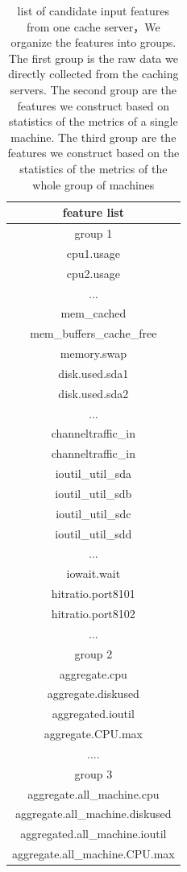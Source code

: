 \documentclass[5p]{elsarticle}
\begin{document}
\begin{table}[]
\centering
\begin{tabular}{|c|}
\hline  
feature list\\
\hline  
group 1\\
\hline  
cpu1.usage\\
cpu2.usage\\
...  \\
mem\_cached\\
mem\_buffers\_cache\_free\\
memory.swap\\ 
disk.used.sda1\\
disk.used.sda2\\
...\\
channeltraffic\_in\\
channeltraffic\_in\\
ioutil\_util\_sda\\
ioutil\_util\_sdb\\
ioutil\_util\_sdc\\
ioutil\_util\_sdd\\
...\\
iowait.wait\\
hitratio.port8101\\
hitratio.port8102\\
...\\
\hline  
group 2\\
\hline 
aggregate.cpu\\
aggregate.diskused\\
aggregated.ioutil\\
aggregate.CPU.max\\
....\\
\hline  
group 3\\
\hline 
aggregate.all\_machine.cpu\\
aggregate.all\_machine.diskused\\
aggregated.all\_machine.ioutil\\
aggregate.all\_machine.CPU.max\\
\hline
\end{tabular}
\caption{list of candidate input features from one cache server，We organize the features into groups. The first group is the raw data we directly collected from the caching servers. The second group are the features we construct based on statistics of the metrics of a single machine. The third group are the features we construct based on the statistics of the metrics of the whole group of machines}
\label{my-label}
\end{table}
\end{document}
